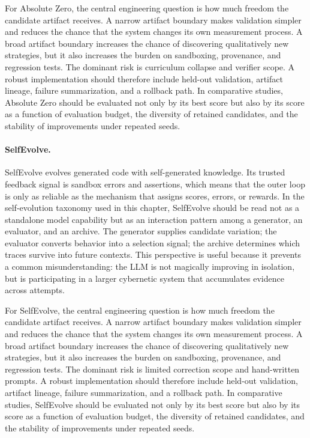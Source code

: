 For Absolute Zero, the central engineering question is how much freedom the candidate artifact receives.  A narrow artifact boundary makes validation simpler and reduces the chance that the system changes its own measurement process.  A broad artifact boundary increases the chance of discovering qualitatively new strategies, but it also increases the burden on sandboxing, provenance, and regression tests.  The dominant risk is curriculum collapse and verifier scope.  A robust implementation should therefore include held-out validation, artifact lineage, failure summarization, and a rollback path.  In comparative studies, Absolute Zero should be evaluated not only by its best score but also by its score as a function of evaluation budget, the diversity of retained candidates, and the stability of improvements under repeated seeds.

\paragraph{SelfEvolve.} SelfEvolve evolves generated code with self-generated knowledge.  Its trusted feedback signal is sandbox errors and assertions, which means that the outer loop is only as reliable as the mechanism that assigns scores, errors, or rewards.  In the self-evolution taxonomy used in this chapter, SelfEvolve should be read not as a standalone model capability but as an interaction pattern among a generator, an evaluator, and an archive.  The generator supplies candidate variation; the evaluator converts behavior into a selection signal; the archive determines which traces survive into future contexts.  This perspective is useful because it prevents a common misunderstanding: the LLM is not magically improving in isolation, but is participating in a larger cybernetic system that accumulates evidence across attempts.

For SelfEvolve, the central engineering question is how much freedom the candidate artifact receives.  A narrow artifact boundary makes validation simpler and reduces the chance that the system changes its own measurement process.  A broad artifact boundary increases the chance of discovering qualitatively new strategies, but it also increases the burden on sandboxing, provenance, and regression tests.  The dominant risk is limited correction scope and hand-written prompts.  A robust implementation should therefore include held-out validation, artifact lineage, failure summarization, and a rollback path.  In comparative studies, SelfEvolve should be evaluated not only by its best score but also by its score as a function of evaluation budget, the diversity of retained candidates, and the stability of improvements under repeated seeds.


